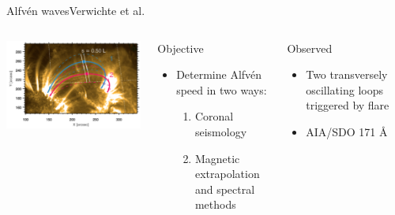 \documentclass[11pt,table]{beamer}
\begin{document}
\begin{frame}[t]{Alfv\'en waves}{Verwichte et al.}
    \begin{columns}
        \includegraphics[width=\textwidth]{tor22.png}
        \begin{block}{Objective}
            \begin{itemize}
                \item Determine Alfv\'en speed in two ways:
                    \begin{enumerate}
                        \item Coronal seismology
                        \item Magnetic extrapolation and spectral methods
                    \end{enumerate}
            \end{itemize}
        \end{block}
        \begin{block}{Observed}
            \begin{itemize}
                \item Two transversely oscillating loops triggered by flare
                \item AIA/SDO 171 \AA{}
            \end{itemize}
        \end{block}
    \end{columns}
\end{frame}%
\end{document}
